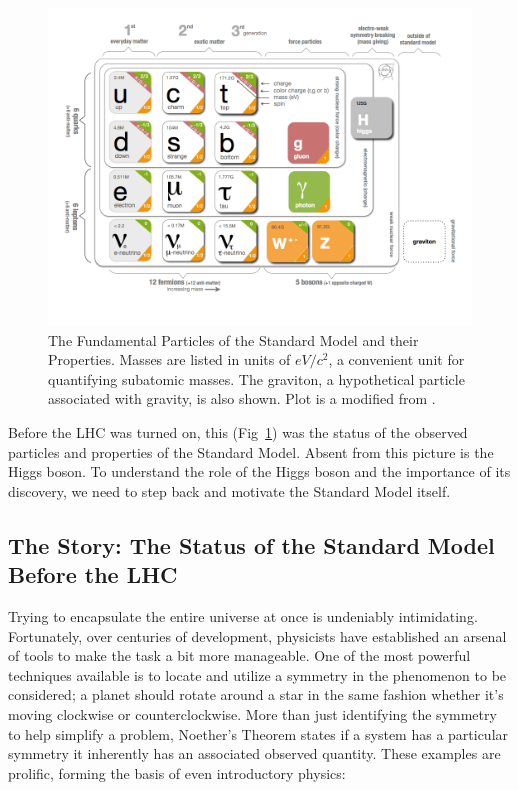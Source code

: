 \begin{figure}[H]
\begin{center}
\includegraphics[width=.9\linewidth]{Introduction/figures/SMinfographic_image.png}
\caption[Fundamental Particles of The Standard Model]{The Fundamental Particles of the Standard Model and their Properties. Masses are listed in units of $eV/c^2$, a convenient unit\footnotemark{} for quantifying subatomic masses. The graviton, a hypothetical particle associated with gravity, is also shown. Plot is a modified from \cite{SMinfo:2012sm}.}
\label{fig:fundamentals}
\end{center}
\end{figure}


Before the LHC was turned on, this (Fig~\ref{fig:fundamentals}) was the status of the observed particles and properties of the Standard Model. Absent from this picture is the Higgs boson. To understand the role of the Higgs boson and the importance of its discovery, we need to step back and motivate the Standard Model itself.

\subsection{The Story: The Status of the Standard Model Before the LHC}
\label{sec:SMpreLHC}

Trying to encapsulate the entire universe at once is undeniably intimidating. Fortunately, over centuries of development, physicists have established an arsenal of tools to make the task a bit more manageable. One of the most powerful techniques available is to locate and utilize a symmetry in the phenomenon to be considered; a planet should rotate around a star in the same fashion whether it's moving clockwise or counterclockwise. More than just identifying the symmetry to help simplify a problem, Noether's Theorem states if a system has a particular symmetry it inherently has an associated observed quantity. These examples are prolific, forming the basis of even introductory physics:

